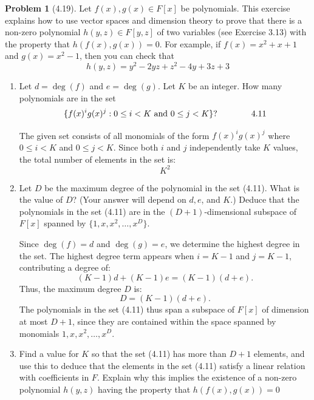 \documentclass[12pt]{article}
\theoremstyle{definition}
\newtheorem{problem}{Problem}
\begin{document}
\begin{problem}[4.19]
    Let $f(x), g(x) \in F[x]$ be polynomials. This exercise explains how to use vector spaces and dimension
    theory to prove that there is a non-zero polynomial $h(y, z) \in F[y, z]$ of two variables (see Exercise 3.13)
    with the property that $h(f(x), g(x)) = 0$. For example, if $f(x) = x^2 + x + 1$ and $g(x) = x^2 - 1$, then 
    you can check that
    \[
        h(y, z) = y^2 - 2yz + z^2 - 4y + 3z + 3
    \]
    \begin{enumerate}[label=(\alph*)]
        \item Let $d = \deg(f)$ and $e = \deg(g)$. Let $K$ be an integer. How many polynomials are in the set
              \[
                  \{ f(x)^ig(x)^j : 0 \leq i < K \text{ and } 0 \leq j < K \}? \hspace{40px} \text{4.11}
              \]

        \begin{solution}
            The given set consists of all monomials of the form $f(x)^i g(x)^j$ where $0 \leq i < K$ and $0 \leq j < K$. Since both $i$ and $j$ independently take $K$ values, the total number of elements in the set is:
            \[
                K^2
            \]
        \end{solution}

        \item Let $D$ be the maximum degree of the polynomial in the set (4.11). What is the value of $D$?
              (Your answer will depend on $d, e$, and $K$.) Deduce that the polynomials in the set (4.11)
              are in the $(D + 1)$-dimensional subspace of $F[x]$ spanned by $\{ 1, x, x^2, \ldots, x^D \}$.

        \begin{solution}
            Since $\deg(f) = d$ and $\deg(g) = e$, we determine the highest degree in the set. The highest degree term appears when $i = K-1$ and $j = K-1$, contributing a degree of:
            \[
                (K - 1)d + (K - 1)e = (K - 1)(d + e).
            \]
            Thus, the maximum degree $D$ is:
            \[
                D = (K - 1)(d + e).
            \]
            The polynomials in the set (4.11) thus span a subspace of $F[x]$ of dimension at most $D+1$, since they are contained within the space spanned by monomials $1, x, x^2, \dots, x^D$.
            
        \end{solution}

        \item Find a value for $K$ so that the set (4.11) has more than $D + 1$ elements, and use this to
              deduce that the elements in the set (4.11) satisfy a linear relation with coefficients in $F$.
              Explain why this implies the existence of a non-zero polynomial $h(y, z)$ having the property
              that $h(f(x), g(x)) = 0$


\end{enumerate}
\end{problem}
\end{document}
